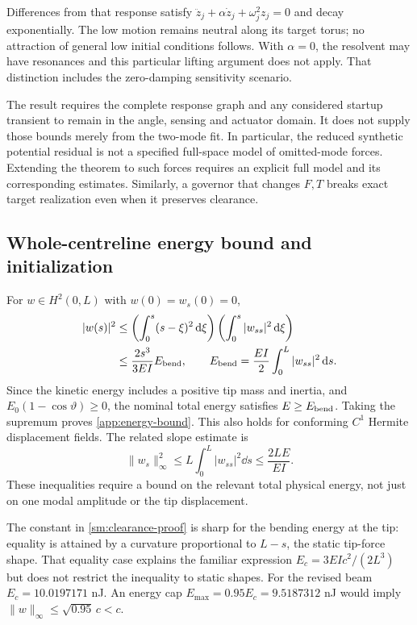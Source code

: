 Differences from that response satisfy
$\ddot z_j+\alpha\dot z_j+\omega_j^2z_j=0$ and decay exponentially.
The low motion remains neutral along its target torus; no attraction
of general low initial conditions follows. With $\alpha=0$, the
resolvent may have resonances and this particular lifting argument
does not apply. That distinction includes the zero-damping sensitivity
scenario.

The result requires the complete response graph and any considered
startup transient to remain in the angle, sensing and actuator domain.
It does not supply those bounds merely from the two-mode fit.
In particular, the reduced synthetic potential residual is not a
specified full-space model of omitted-mode forces. Extending the
theorem to such forces requires an explicit full model and its
corresponding estimates. Similarly, a governor that changes $F,T$
breaks exact target realization even when it preserves clearance.

\subsection{Whole-centreline energy bound and initialization}
\label{sm:clearance}
For $w\in H^2(0,L)$ with $w(0)=w_s(0)=0$,
\begin{align}
 |w(s)|^2
 &\le\left(\int_0^s(s-\xi)^2\,\mathrm d\xi\right)
                \left(\int_0^s|w_{ss}|^2\,\mathrm d\xi\right)\nonumber\\
 &\le\frac{2s^3}{3EI}E_{\rm bend},\qquad
 E_{\rm bend}=\frac{EI}{2}\int_0^L|w_{ss}|^2\,\mathrm d s.
 \label{sm:clearance-proof}
\end{align}
Since the kinetic energy includes a positive tip mass and inertia,
and $E_0(1-\cos\vartheta)\ge0$, the nominal total energy satisfies
$E\ge E_{\rm bend}$. Taking the supremum proves
\eqref{app:energy-bound}. This also holds for conforming $C^1$
Hermite displacement fields. The related slope estimate is
\begin{equation}
 \|w_s\|_\infty^2
 \le L\int_0^L|w_{ss}|^2\dd s
 \le\frac{2LE}{EI}.
 \label{sm:slope-energy}
\end{equation}
These inequalities require a bound on the relevant total physical
energy, not just on one modal amplitude or the tip displacement.

The constant in \eqref{sm:clearance-proof} is sharp for the bending
energy at the tip: equality is attained by a curvature proportional
to $L-s$, the static tip-force shape. That equality case explains
the familiar expression $E_c=3EIc^2/(2L^3)$ but does not restrict the
inequality to static shapes.
For the revised beam $E_c=10.0197171$ nJ.
An energy cap $E_{\max}=0.95E_c=9.5187312$ nJ would imply
$\|w\|_\infty\le\sqrt{0.95}\,c<c$.

